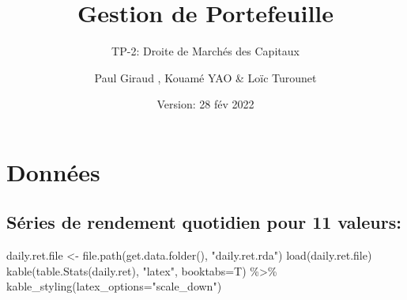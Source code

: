 \documentclass[
]{article}
\title{Gestion de Portefeuille}
\subtitle{TP-2: Droite de Marchés des Capitaux}
\author{Paul Giraud , Kouamé YAO \& Loïc Turounet}
\date{Version: 28 fév 2022}
\newenvironment{Shaded}{\begin{snugshade}}{\end{snugshade}}
\newcommand{\AttributeTok}[1]{\textcolor[rgb]{0.77,0.63,0.00}{#1}}
\newcommand{\FunctionTok}[1]{\textcolor[rgb]{0.00,0.00,0.00}{#1}}
\newcommand{\NormalTok}[1]{#1}
\newcommand{\OtherTok}[1]{\textcolor[rgb]{0.56,0.35,0.01}{#1}}
\newcommand{\SpecialCharTok}[1]{\textcolor[rgb]{0.00,0.00,0.00}{#1}}
\newcommand{\StringTok}[1]{\textcolor[rgb]{0.31,0.60,0.02}{#1}}
\begin{document}
\maketitle

\hypertarget{donnuxe9es}{%
\section{Données}\label{donnuxe9es}}

\hypertarget{suxe9ries-de-rendement-quotidien-pour-11-valeurs}{%
\subsection{Séries de rendement quotidien pour 11
valeurs:}\label{suxe9ries-de-rendement-quotidien-pour-11-valeurs}}

\begin{Shaded}
\begin{Highlighting}[]
\NormalTok{daily.ret.file }\OtherTok{\textless{}{-}} \FunctionTok{file.path}\NormalTok{(}\FunctionTok{get.data.folder}\NormalTok{(), }\StringTok{"daily.ret.rda"}\NormalTok{)}
\FunctionTok{load}\NormalTok{(daily.ret.file)}
\FunctionTok{kable}\NormalTok{(}\FunctionTok{table.Stats}\NormalTok{(daily.ret), }\StringTok{"latex"}\NormalTok{, }\AttributeTok{booktabs=}\NormalTok{T) }\SpecialCharTok{\%\textgreater{}\%} \FunctionTok{kable\_styling}\NormalTok{(}\AttributeTok{latex\_options=}\StringTok{"scale\_down"}\NormalTok{)}
\end{Highlighting}
\end{Shaded}
\end{document}
